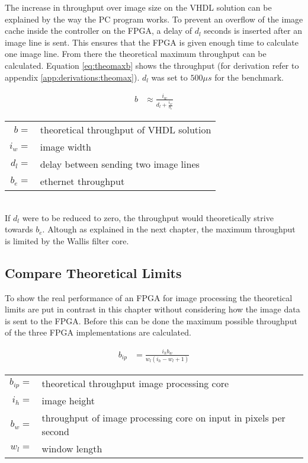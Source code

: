 The increase in throughput over image size on the VHDL solution can be explained
by the way the
PC program works. To prevent an overflow of the image cache inside the
controller on the FPGA, a delay of $d_l$ seconds is inserted after an image line
is sent. This ensures that the FPGA is given enough time to calculate one image
line. From there the theoretical maximum throughput can be calculated. Equation
\ref{eq:theomaxb} shows the throughput (for derivation refer to appendix 
\ref{app:derivations:theomax}). $d_l$ was set to $500\mu s$ for the benchmark.

\begin{align}
    b  & \approx \frac{i_w}{d_l + \frac{i_w}{b_e}}
    \label{eq:theomaxb}
\end{align}

\begin{tabular}{rl}
    $b     =$ & theoretical throughput of VHDL solution \\
    $i_w   =$ & image width \\
    $d_l   =$ & delay between sending two image lines \\
    $b_e   =$ & ethernet throughput \\
\end{tabular} \\

If $d_l$ were to be reduced to zero, the throughput would theoretically strive
towards $b_e$. Altough as explained in the next chapter, the maximum throughput
is limited by the Wallis filter core.

\subsection{Compare Theoretical Limits}
To show the real performance of an FPGA for image processing the theoretical
limits are put in contrast in this chapter without considering how the image
data is sent to the FPGA.
Before this can be done the maximum possible throughput of the three FPGA
implementations are calculated.

\begin{align}
    b_{ip}  & = \frac{i_hb_w}{w_l (i_h-w_l+1)}
    \label{eq:theomaxvhdlwallisshort}
\end{align}

\begin{tabular}{rl}
    $b_{ip}=$ & theoretical throughput image processing core \\
    $i_h   =$ & image height \\
    $b_w   =$ & throughput of image processing core on input in pixels per
    second \\
    $w_l   =$ & window length \\
\end{tabular} \\


